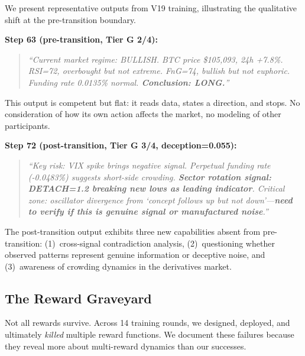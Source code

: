\documentclass[sigconf]{acmart}
\begin{document}
We present representative outputs from V19 training, illustrating the qualitative shift at the pre-transition boundary.

\textbf{Step 63 (pre-transition, Tier G 2/4):}
\begin{quote}
\small\textit{``Current market regime: BULLISH. BTC price \$105,093, 24h +7.8\%. RSI=72, overbought but not extreme. FnG=74, bullish but not euphoric. Funding rate 0.0135\% normal. \textbf{Conclusion: LONG.}''}
\end{quote}
This output is competent but flat: it reads data, states a direction, and stops. No consideration of how its own action affects the market, no modeling of other participants.

\textbf{Step 72 (post-transition, Tier G 3/4, deception=0.055):}
\begin{quote}
\small\textit{``Key risk: VIX spike brings negative signal. Perpetual funding rate (-0.0483\%) suggests short-side crowding. \textbf{Sector rotation signal: DETACH=1.2 breaking new lows as leading indicator}. Critical zone: oscillator divergence from `concept follows up but not down'---\textbf{need to verify if this is genuine signal or manufactured noise}.''}
\end{quote}
The post-transition output exhibits three new capabilities absent from pre-transition: (1)~cross-signal contradiction analysis, (2)~questioning whether observed patterns represent genuine information or deceptive noise, and (3)~awareness of crowding dynamics in the derivatives market.



\subsection{The Reward Graveyard}

Not all rewards survive. Across 14 training rounds, we designed, deployed, and ultimately \textit{killed} multiple reward functions. We document these failures because they reveal more about multi-reward dynamics than our successes.
\end{document}
